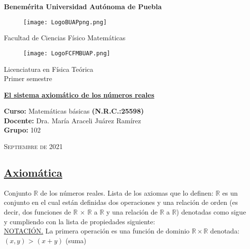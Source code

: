 \documentclass[12pt]{article}
\begin{document}
\sffamily
\thispagestyle{empty} 
\begin{center} \LARGE{\bf Benemérita Universidad Autónoma de Puebla} \\[0.5cm]
\begin{figure}[htb] \centering \texttt{[image: LogoBUAPpng.png]} \end{figure}
\LARGE{Facultad de Ciencias Físico Matemáticas}\\[0.5cm]
\begin{figure}[htb] \centering \texttt{[image: LogoFCFMBUAP.png]} \end{figure} 
\Large{Licenciatura en Física Teórica}\\[0.5cm]
\large{Primer semestre} \end{center}
\begin{center} { \Large \bfseries{\underline{El sistema axiomático de los números reales}}} \\ \end{center}
\large{\bf Curso:} Matemáticas básicas \textbf{(N.R.C.:25598)}\\
\large{\bf Docente:} Dra. María Araceli Juárez Ramírez\\
\large{\bf Grupo:} 102\\ \begin{center} 
\vfill
\textsc{Septiembre de 2021} \end{center}  
\newpage

\begin{center}
    \section*{\underline{Axiomática}}
\end{center}

Conjunto $\mathbb{ R }$ de los números reales. Lista de los axiomas que lo definen: $\mathbb{ R }$ es un conjunto en el cual están definidas dos operaciones y una relación de \textemdash orden (es decir, dos funciones de $\mathbb{R}$ $\times$ $\mathbb{R}$ a $\mathbb{R}$ y una relación de $\mathbb{R}$ a $\mathbb{R}$) denotadas como sigue y cumpliendo con la lista de propiedades siguiente: \\

{\underline{NOTACIÓN.}} La primera operación es una función de dominio $\mathbb{R}  \times  \mathbb{R}$ denotada:\\

$(x,y)$ \hspace{.1cm} \textendash\textendash\textendash\textendash \textendash\textendash\textendash\textendash\textendash\textendash\textendash\textendash \textendash\textendash\textendash\textendash   \textgreater \hspace{.1cm} $ (x+y) $ \hspace{.1cm} (suma)\\
\end{document}
